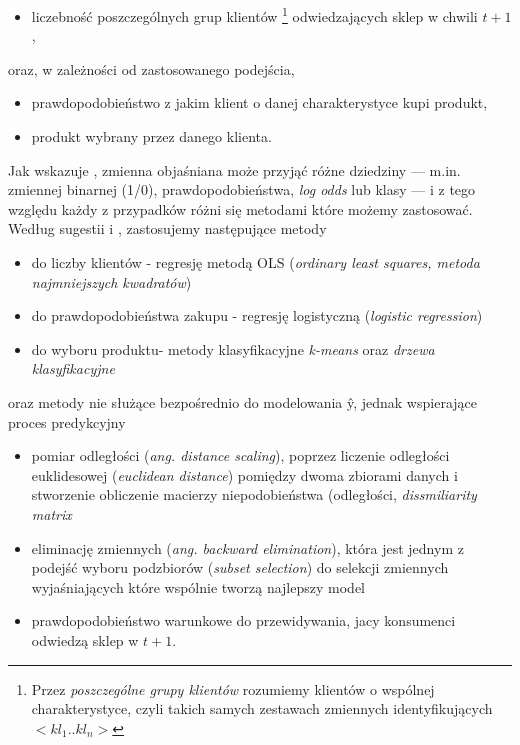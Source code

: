 \documentclass[polish, twoside, 12pt, a4paper]{article}
\theoremstyle{definition}
\theoremstyle{plain}
\theoremstyle{remark}
\begin{document}
	\begin{itemize} 
		\item liczebność poszczególnych grup klientów \footnote{Przez \textit{poszczególne grupy klientów} rozumiemy klientów o wspólnej charakterystyce, czyli takich samych zestawach zmiennych identyfikujących $<kl_1..kl_n>$} odwiedzających sklep w chwili $t+1$,
	\end{itemize}
	oraz, w zależności od zastosowanego podejścia,
	\begin{itemize} 
		\item prawdopodobieństwo z jakim klient o danej charakterystyce kupi produkt,
		\item produkt wybrany przez danego klienta.
	\end{itemize}

Jak wskazuje \cite{James2013}, zmienna objaśniana może przyjąć różne dziedziny --- m.in. zmiennej binarnej (1/0), prawdopodobieństwa, \textit{log odds} lub klasy --- i z tego względu każdy z przypadków różni się metodami które możemy zastosować. Według sugestii \cite{James2013} i \cite{hastie2001} , zastosujemy następujące metody

	\begin{itemize} 
		\item do liczby klientów - regresję metodą OLS (\textit{ordinary least squares, metoda najmniejszych kwadratów})
		\item do prawdopodobieństwa zakupu - regresję logistyczną (\textit{logistic regression})
		\item do wyboru produktu- metody klasyfikacyjne \textit{k-means} oraz \textit{drzewa klasyfikacyjne}
	\end{itemize}
	oraz metody nie służące bezpośrednio do modelowania \^{y}, jednak wspierające proces predykcyjny
	\begin{itemize} 
		\item pomiar odległości (\textit{ang. distance scaling}), poprzez liczenie odległości euklidesowej (\textit{euclidean distance}) pomiędzy dwoma zbiorami danych i stworzenie obliczenie macierzy niepodobieństwa (odległości, \textit{dissmiliarity matrix}
		\item eliminację zmiennych (\textit{ang. backward elimination}), która jest jednym z podejść wyboru podzbiorów (\textit{subset selection}) do selekcji zmiennych wyjaśniających które wspólnie tworzą najlepszy model
		\item prawdopodobieństwo warunkowe do przewidywania, jacy konsumenci odwiedzą sklep w $t+1$.
	\end{itemize}	
\end{document}
